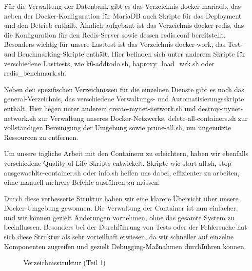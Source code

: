 Für die Verwaltung der Datenbank gibt es das Verzeichnis docker-mariadb, das neben der Docker-Konfiguration für MariaDB auch Skripte für das Deployment und den Betrieb enthält. Ähnlich aufgebaut ist das Verzeichnis docker-redis, das die Konfiguration für den Redis-Server sowie dessen redis.conf bereitstellt. Besonders wichtig für unsere Lasttest ist das Verzeichnis docker-work, das Test- und Benchmarking-Skripte enthält. Hier befinden sich unter anderem Skripte für verschiedene Lasttests, wie k6-addtodo.sh, haproxy\_load\_wrk.sh oder redis\_benchmark.sh.

Neben den spezifischen Verzeichnissen für die einzelnen Dienste gibt es noch das general-Verzeichnis, das verschiedene Verwaltungs- und Automatisierungsskripte enthält. Hier liegen unter anderem create-mynet-network.sh und destroy-mynet-network.sh zur Verwaltung unseres Docker-Netzwerks, delete-all-containers.sh zur vollständigen Bereinigung der Umgebung sowie prune-all.sh, um ungenutzte Ressourcen zu entfernen.

Um unsere tägliche Arbeit mit den Containern zu erleichtern, haben wir ebenfalls verschiedene Quality-of-Life-Skripte entwickelt. Skripte wie start-all.sh, stop-ausgewaehlte-container.sh oder info.sh helfen uns dabei, effizienter zu arbeiten, ohne manuell mehrere Befehle ausführen zu müssen.

Durch diese verbesserte Struktur haben wir eine klarere Übersicht über unsere Docker-Umgebung gewonnen. Die Verwaltung der Container ist nun einfacher, und wir können gezielt Änderungen vornehmen, ohne das gesamte System zu beeinflussen. Besonders bei der Durchführung von Tests oder der Fehlersuche hat sich diese Struktur als sehr vorteilhaft erwiesen, da wir schneller auf einzelne Komponenten zugreifen und gezielt Debugging-Maßnahmen durchführen können.


\FloatBarrier
\begin{figure}[!ht]
    \caption[Verzeichnisstruktur (Teil 1)]{Verzeichnisstruktur (Teil 1)}
    \label{dirtree-part1}
\end{figure}

